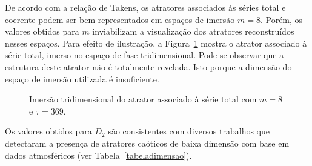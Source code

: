 De acordo com a relação de Takens, %
os atratores associados às séries total e coerente podem ser bem representados em espaços de imersão $m=8$. Porém, os valores obtidos para $m$ inviabilizam a visualização dos atratores reconstruídos nesses espaços. Para efeito de ilustração, a Figura~\ref{figatratortS0681200} mostra o atrator associado à série total, imerso no espaço de fase tridimensional. Pode-se observar que a estrutura deste atrator não é totalmente revelada. Isto porque a dimensão do espaço de imersão utilizada é insuficiente.

\begin{figure}[ht]
\centering{}
\caption{Imersão tridimensional do atrator associado à série total com $m=8$ e $\tau=369$.}
\label{figatratortS0681200}
\end{figure}


Os valores obtidos para $D_{2}$ são consistentes com diversos trabalhos que detectaram a presença de atratores caóticos de baixa dimensão com base em dados atmosféricos (ver Tabela~\ref{tabeladimensao}).

